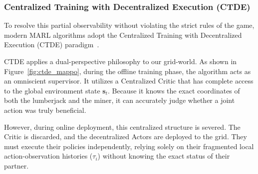 \subsubsection{Centralized Training with Decentralized Execution (CTDE)}
\label{subsec:ctde}

To resolve this partial observability without violating the strict rules of the game, modern MARL algorithms adopt the Centralized Training with Decentralized Execution (CTDE) paradigm~\parencite{Albrecht_Christianos_Schäfer_2024}. 

CTDE applies a dual-perspective philosophy to our grid-world. As shown in Figure~\ref{fig:ctde_mappo}, during the offline training phase, the algorithm acts as an omniscient supervisor. It utilizes a Centralized Critic that has complete access to the global environment state $\mathbf{s}_t$. Because it knows the exact coordinates of both the lumberjack and the miner, it can accurately judge whether a joint action was truly beneficial. 

However, during online deployment, this centralized structure is severed. The Critic is discarded, and the decentralized Actors are deployed to the grid. They must execute their policies independently, relying solely on their fragmented local action-observation histories ($\tau_i$) without knowing the exact status of their partner.

